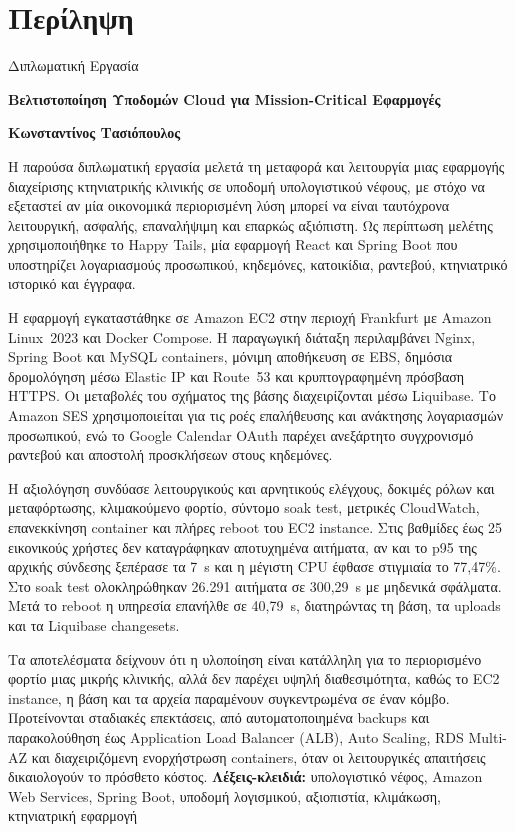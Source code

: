 \documentclass[12pt,a4paper,twoside,fleqn]{book}
\newcommand{\ThesisTitleGreek}{Βελτιστοποίηση Υποδομών Cloud για Mission-Critical Εφαρμογές}
\newcommand{\AuthorGreek}{Κωνσταντίνος Τασιόπουλος}
\begin{document}
\chapter*{Περίληψη}
\begin{center}
  {\Large Διπλωματική Εργασία\par}
  \vspace{0.5cm}
  {\large\bfseries \ThesisTitleGreek\par}
  \vspace{0.5cm}
  {\large\bfseries \AuthorGreek\par}
\end{center}
Η παρούσα διπλωματική εργασία μελετά τη μεταφορά και λειτουργία μιας
εφαρμογής διαχείρισης κτηνιατρικής κλινικής σε υποδομή υπολογιστικού νέφους,
με στόχο να εξεταστεί αν μία οικονομικά περιορισμένη λύση μπορεί να είναι
ταυτόχρονα λειτουργική, ασφαλής, επαναλήψιμη και επαρκώς αξιόπιστη. Ως
περίπτωση μελέτης χρησιμοποιήθηκε το Happy Tails, μία εφαρμογή React και
Spring Boot που υποστηρίζει λογαριασμούς προσωπικού, κηδεμόνες, κατοικίδια,
ραντεβού, κτηνιατρικό ιστορικό και έγγραφα.

Η εφαρμογή εγκαταστάθηκε σε Amazon EC2 στην περιοχή Frankfurt με Amazon
Linux~2023 και Docker Compose. Η παραγωγική διάταξη περιλαμβάνει Nginx,
Spring Boot και MySQL containers, μόνιμη αποθήκευση σε EBS, δημόσια
δρομολόγηση μέσω Elastic IP και Route~53 και κρυπτογραφημένη πρόσβαση HTTPS.
Οι μεταβολές του σχήματος της βάσης διαχειρίζονται μέσω Liquibase. Το Amazon
SES χρησιμοποιείται για τις ροές επαλήθευσης και ανάκτησης λογαριασμών
προσωπικού, ενώ το Google Calendar OAuth παρέχει ανεξάρτητο συγχρονισμό
ραντεβού και αποστολή προσκλήσεων στους κηδεμόνες.

Η αξιολόγηση συνδύασε λειτουργικούς και αρνητικούς ελέγχους, δοκιμές ρόλων
και μεταφόρτωσης, κλιμακούμενο φορτίο, σύντομο soak test, μετρικές
CloudWatch, επανεκκίνηση container και πλήρες reboot του EC2 instance. Στις
βαθμίδες έως 25 εικονικούς χρήστες δεν καταγράφηκαν αποτυχημένα αιτήματα,
αν και το p95 της αρχικής σύνδεσης ξεπέρασε τα 7~s και η μέγιστη CPU έφθασε
στιγμιαία το 77,47\%. Στο soak test ολοκληρώθηκαν 26.291 αιτήματα σε
300,29~s με μηδενικά σφάλματα. Μετά το reboot η υπηρεσία επανήλθε σε
40,79~s, διατηρώντας τη βάση, τα uploads και τα Liquibase changesets.

Τα αποτελέσματα δείχνουν ότι η υλοποίηση είναι κατάλληλη για το περιορισμένο
φορτίο μιας μικρής κλινικής, αλλά δεν παρέχει υψηλή διαθεσιμότητα, καθώς το
EC2 instance, η βάση και τα αρχεία παραμένουν συγκεντρωμένα σε έναν κόμβο.
Προτείνονται σταδιακές επεκτάσεις, από αυτοματοποιημένα backups και
παρακολούθηση έως Application Load Balancer (ALB), Auto Scaling, RDS
Multi-AZ και διαχειριζόμενη
ενορχήστρωση containers, όταν οι λειτουργικές απαιτήσεις δικαιολογούν το
πρόσθετο κόστος.
\vspace{0.6cm}
\noindent\textbf{Λέξεις-κλειδιά:} υπολογιστικό νέφος, Amazon Web Services, Spring Boot, υποδομή λογισμικού, αξιοπιστία, κλιμάκωση, κτηνιατρική εφαρμογή
\end{document}

